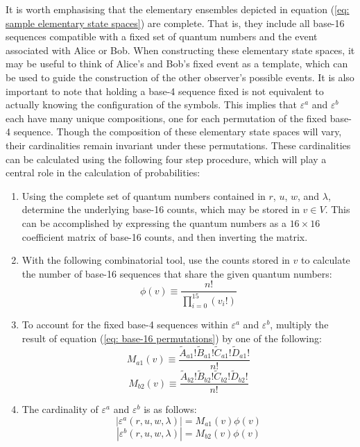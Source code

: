 \documentclass{article}
\begin{document}
It is worth emphasising that the elementary ensembles depicted in equation (\ref{eq: sample elementary state spaces}) are complete. That is, they include all base-16 sequences compatible with a fixed set of quantum numbers and the event associated with Alice or Bob. When constructing these elementary state spaces, it may be useful to think of Alice's and Bob's fixed event as a template, which can be used to guide the construction of the other observer's possible events. It is also important to note that holding a base-4 sequence fixed is not equivalent to actually knowing the configuration of the symbols. This implies that $\varepsilon^a$ and $\varepsilon^b$ each have many unique compositions, one for each permutation of the fixed base-4 sequence. Though the composition of these elementary state spaces will vary, their cardinalities remain invariant under these permutations. These cardinalities can be calculated using the following four step procedure, which will play a central role in the calculation of probabilities: 

\begin{enumerate}
\item Using the complete set of quantum numbers contained in $r$, $u$, $w$, and $\lambda$, determine the underlying base-16 counts, which may be stored in $v \in V$. This can be accomplished by expressing the quantum numbers as a $16\times16$ coefficient matrix of base-16 counts, and then inverting the matrix. 
\item With the following combinatorial tool, use the counts stored in $v$ to calculate the number of base-16 sequences that share the given quantum numbers:
\begin{equation}
\phi(v)\equiv\frac{n!}{\prod^{15}_{i=0}\left(v_i!\right)}
\label{eq: base-16 permutations}
\end{equation}
\item To account for the fixed base-4 sequences within $\varepsilon^a$ and $\varepsilon^b$, multiply the result of equation (\ref{eq: base-16 permutations}) by one of the following:
\begin{equation}
    M_{a1}(v)\equiv\frac{\tilde{A}_{a1}!\tilde{B}_{a1}!\tilde{C}_{a1}!\tilde{D}_{a1}!}{n!}
    \label{eq: Alice's evidence}
\end{equation}
\begin{equation}
    M_{b2}(v)\equiv\frac{\tilde{A}_{b2}!\tilde{B}_{b2}!\tilde{C}_{b2}!\tilde{D}_{b2}!}{n!}
    \label{eq: Bob's evidence}
\end{equation}
\item The cardinality of $\varepsilon^a$ and $\varepsilon^b$ is as follows:
\begin{equation}
    |\varepsilon^a(r,u,w,\lambda)|=M_{a1}(v)\phi(v)
    \label{eq: Alice's elementary cardinality}
\end{equation}
\begin{equation}
    |\varepsilon^b(r,u,w,\lambda)|=M_{b2}(v)\phi(v)
    \label{eq: Bob's elementary cardinality}
\end{equation}
\end{enumerate}
\end{document}
